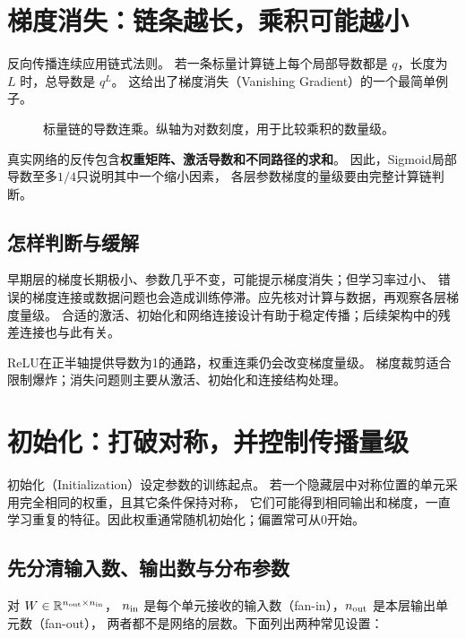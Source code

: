\section{梯度消失：链条越长，乘积可能越小}
\label{sec:train-vanishing}

反向传播连续应用链式法则。
若一条标量计算链上每个局部导数都是 $q$，长度为 $L$ 时，总导数是 $q^L$。
这给出了梯度消失（Vanishing Gradient）的一个最简单例子。

\begin{figure}[htbp]
\centering

\caption{标量链的导数连乘。纵轴为对数刻度，用于比较乘积的数量级。}
\label{fig:train-vanishing}
\par\smallskip
{}
\end{figure}

真实网络的反传包含\textbf{权重矩阵、激活导数和不同路径的求和}。
因此，Sigmoid局部导数至多$1/4$只说明其中一个缩小因素，
各层参数梯度的量级要由完整计算链判断。

\subsection{怎样判断与缓解}
早期层的梯度长期极小、参数几乎不变，可能提示梯度消失；但学习率过小、
错误的梯度连接或数据问题也会造成训练停滞。应先核对计算与数据，再观察各层梯度量级。
合适的激活、初始化和网络连接设计有助于稳定传播；后续架构中的残差连接也与此有关。

ReLU在正半轴提供导数为1的通路，权重连乘仍会改变梯度量级。
梯度裁剪适合限制爆炸；消失问题则主要从激活、初始化和连接结构处理。


\section{初始化：打破对称，并控制传播量级}
\label{sec:train-initialization}

初始化（Initialization）设定参数的训练起点。
若一个隐藏层中对称位置的单元采用完全相同的权重，且其它条件保持对称，
它们可能得到相同输出和梯度，一直学习重复的特征。因此权重通常随机初始化；偏置常可从0开始。

\subsection{先分清输入数、输出数与分布参数}
对 $W\in\mathbb{R}^{n_{\rm out}\times n_{\rm in}}$，
$n_{\rm in}$ 是每个单元接收的输入数（fan-in），$n_{\rm out}$ 是本层输出单元数（fan-out），
两者都不是网络的层数。下面列出两种常见设置：

